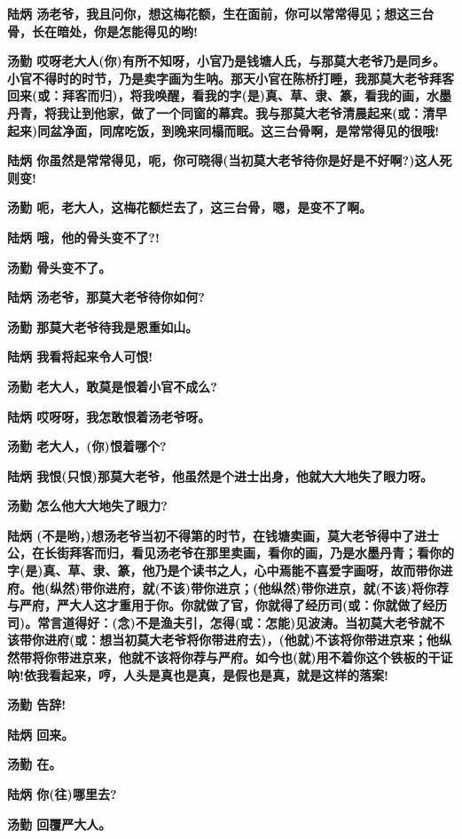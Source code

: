 \textbf{陆炳
汤老爷，我且问你，想这梅花额，生在面前，你可以常常得见；想这三台骨，长在暗处，你是怎能得见的哟!}

\textbf{汤勤
哎呀老大人(你)有所不知呀，小官乃是钱塘人氏，与那莫大老爷乃是同乡。小官不得时的时节，乃是卖字画为生呐。那天小官在陈桥打睡，我那莫大老爷拜客回来(或：拜客而归)，将我唤醒，看我的字(是)真、草、隶、篆，看我的画，水墨丹青，将我让到他家，做了一个同窗的幕宾。我与那莫大老爷清晨起来(或：清早起来)同盆净面，同席吃饭，到晚来同榻而眠。这三台骨啊，是常常得见的很哦!}

\textbf{陆炳
你虽然是常常得见，呃，你可晓得(当初莫大老爷待你是好是不好啊?)这人死则变!}

\textbf{汤勤 呃，老大人，这梅花额烂去了，这三台骨，嗯，是变不了啊。}

\textbf{陆炳 哦，他的骨头变不了?!}

\textbf{汤勤 骨头变不了。}

\textbf{陆炳 汤老爷，那莫大老爷待你如何?}

\textbf{汤勤 那莫大老爷待我是恩重如山。}

\textbf{陆炳 我看将起来令人可恨!}

\textbf{汤勤 老大人，敢莫是恨着小官不成么?}

\textbf{陆炳 哎呀呀，我怎敢恨着汤老爷呀。}

\textbf{汤勤 老大人，(你)恨着哪个?}

\textbf{陆炳
我恨(只恨)那莫大老爷，他虽然是个进士出身，他就大大地失了眼力呀。}

\textbf{汤勤 怎么他大大地失了眼力?}

\textbf{陆炳
(不是哟，)想汤老爷当初不得第的时节，在钱塘卖画，莫大老爷得中了进士公，在长街拜客而归，看见汤老爷在那里卖画，看你的画，乃是水墨丹青；看你的字(是)真、草、隶、篆，他乃是个读书之人，心中焉能不喜爱字画呀，故而带你进府。他(纵然)带你进府，就(不该)带你进京；(他纵然)带你进京，就(不该)将你荐与严府，严大人这才重用于你。你就做了官，你就得了经历司(或：你就做了经历司)。常言道得好：(念)不是渔夫引，怎得(或：怎能)见波涛。当初莫大老爷就不该带你进府(或：想当初莫大老爷将你带进府去)，(他就)不该将你带进京来；他纵然带将你带进京来，他就不该将你荐与严府。如今也(就)用不着你这个铁板的干证呐!依我看起来，哼，人头是真也是真，是假也是真，就是这样的落案!}

\textbf{汤勤 告辞!}

\textbf{陆炳 回来。}

\textbf{汤勤 在。}

\textbf{陆炳 你(往)哪里去?}

\textbf{汤勤 回覆严大人。}

